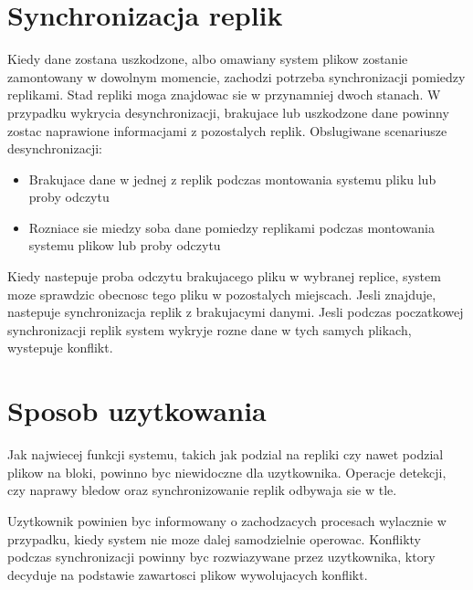 \section {Synchronizacja replik}
Kiedy dane zostana uszkodzone, albo omawiany system plikow zostanie zamontowany w dowolnym momencie, zachodzi potrzeba synchronizacji pomiedzy replikami. Stad repliki moga znajdowac sie w przynamniej dwoch stanach. W przypadku wykrycia desynchronizacji, brakujace lub uszkodzone dane powinny zostac naprawione informacjami z pozostalych replik. Obslugiwane scenariusze desynchronizacji:
\begin{itemize}
    \item Brakujace dane w jednej z replik podczas montowania systemu pliku lub proby odczytu
    \item Rozniace sie miedzy soba dane pomiedzy replikami podczas montowania systemu plikow lub proby odczytu
\end{itemize}
Kiedy nastepuje proba odczytu brakujacego pliku w wybranej replice, system moze sprawdzic obecnosc tego pliku w pozostalych miejscach. Jesli znajduje, nastepuje synchronizacja replik z brakujacymi danymi. Jesli podczas poczatkowej synchronizacji replik system wykryje rozne dane w tych samych plikach, wystepuje konflikt. 

\section {Sposob uzytkowania}
Jak najwiecej funkcji systemu, takich jak podzial na repliki czy nawet podzial plikow na bloki,  powinno byc niewidoczne dla uzytkownika. Operacje detekcji, czy naprawy bledow oraz synchronizowanie replik odbywaja sie w tle.

Uzytkownik powinien byc informowany o zachodzacych procesach wylacznie w przypadku, kiedy system nie moze dalej samodzielnie operowac. Konflikty podczas synchronizacji powinny byc rozwiazywane przez uzytkownika, ktory decyduje na podstawie zawartosci plikow wywolujacych konflikt.

